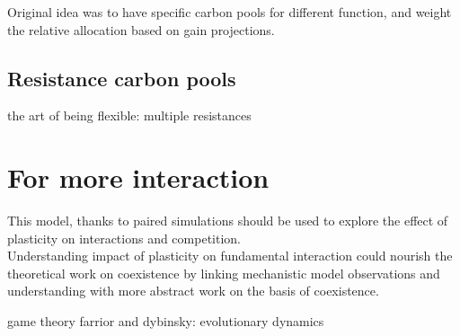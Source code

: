 
Original idea was to have specific carbon pools for different function, and weight the relative allocation based on gain projections.\\

\subsection{Resistance carbon pools}

\cite{pierik_art_2014} the art of being flexible: multiple resistances

\section{For more interaction}

This model, thanks to paired simulations should be used to explore the effect of plasticity on interactions and competition.\\
Understanding impact of plasticity on fundamental interaction could nourish the theoretical work on coexistence by linking mechanistic model observations and understanding with more abstract work on the basis of coexistence.

game theory farrior and dybinsky: evolutionary dynamics



%
%
%
%
%






